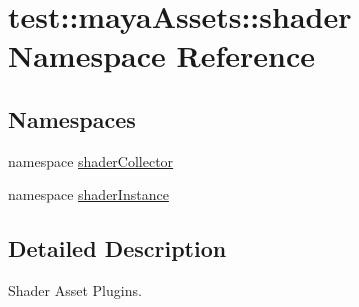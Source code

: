 \hypertarget{namespacetest_1_1mayaAssets_1_1shader}{\section{test\-:\-:maya\-Assets\-:\-:shader \-Namespace \-Reference}
\label{d3/da7/namespacetest_1_1mayaAssets_1_1shader}
}
\subsection*{\-Namespaces}
\begin{DoxyCompactItemize}
\item 
namespace \hyperlink{namespacetest_1_1mayaAssets_1_1shader_1_1shaderCollector}{shader\-Collector}
\item 
namespace \hyperlink{namespacetest_1_1mayaAssets_1_1shader_1_1shaderInstance}{shader\-Instance}
\end{DoxyCompactItemize}


\subsection{\-Detailed \-Description}
\begin{DoxyVerb}
Shader Asset Plugins.
\end{DoxyVerb}
 